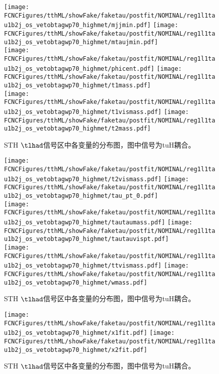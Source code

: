 \begin{figure}[H]
\centering
\texttt{[image: \\FCNCFigures/tthML/showFake/faketau/postfit/NOMINAL/reg1l1tau1b2j\_os\_vetobtagwp70\_highmet/mjjmin.pdf]}
\texttt{[image: \\FCNCFigures/tthML/showFake/faketau/postfit/NOMINAL/reg1l1tau1b2j\_os\_vetobtagwp70\_highmet/mtaujmin.pdf]}
\\
\texttt{[image: \\FCNCFigures/tthML/showFake/faketau/postfit/NOMINAL/reg1l1tau1b2j\_os\_vetobtagwp70\_highmet/phicent.pdf]}
\texttt{[image: \\FCNCFigures/tthML/showFake/faketau/postfit/NOMINAL/reg1l1tau1b2j\_os\_vetobtagwp70\_highmet/t1mass.pdf]}
\\
\texttt{[image: \\FCNCFigures/tthML/showFake/faketau/postfit/NOMINAL/reg1l1tau1b2j\_os\_vetobtagwp70\_highmet/t1vismass.pdf]}
\texttt{[image: \\FCNCFigures/tthML/showFake/faketau/postfit/NOMINAL/reg1l1tau1b2j\_os\_vetobtagwp70\_highmet/t2mass.pdf]}
\\
\caption{STH $\tlhad$信号区中各变量的分布图，图中信号为tuH耦合。}
\label{fig:var_reg1l1tau1b2j_os_vetobtagwp70_highmet_3}
\end{figure}
\begin{figure}[H]
\centering
\texttt{[image: \\FCNCFigures/tthML/showFake/faketau/postfit/NOMINAL/reg1l1tau1b2j\_os\_vetobtagwp70\_highmet/t2vismass.pdf]}
\texttt{[image: \\FCNCFigures/tthML/showFake/faketau/postfit/NOMINAL/reg1l1tau1b2j\_os\_vetobtagwp70\_highmet/tau\_pt\_0.pdf]}
\\
\texttt{[image: \\FCNCFigures/tthML/showFake/faketau/postfit/NOMINAL/reg1l1tau1b2j\_os\_vetobtagwp70\_highmet/tautaumass.pdf]}
\texttt{[image: \\FCNCFigures/tthML/showFake/faketau/postfit/NOMINAL/reg1l1tau1b2j\_os\_vetobtagwp70\_highmet/tautauvispt.pdf]}
\\
\texttt{[image: \\FCNCFigures/tthML/showFake/faketau/postfit/NOMINAL/reg1l1tau1b2j\_os\_vetobtagwp70\_highmet/ttvismass.pdf]}
\texttt{[image: \\FCNCFigures/tthML/showFake/faketau/postfit/NOMINAL/reg1l1tau1b2j\_os\_vetobtagwp70\_highmet/wmass.pdf]}
\\
\caption{STH $\tlhad$信号区中各变量的分布图，图中信号为tuH耦合。}
\label{fig:var_reg1l1tau1b2j_os_vetobtagwp70_highmet_4}
\end{figure}
\begin{figure}[H]
\centering
\texttt{[image: \\FCNCFigures/tthML/showFake/faketau/postfit/NOMINAL/reg1l1tau1b2j\_os\_vetobtagwp70\_highmet/x1fit.pdf]}
\texttt{[image: \\FCNCFigures/tthML/showFake/faketau/postfit/NOMINAL/reg1l1tau1b2j\_os\_vetobtagwp70\_highmet/x2fit.pdf]}
\\
\caption{STH $\tlhad$信号区中各变量的分布图，图中信号为tuH耦合。}
\label{fig:var_reg1l1tau1b2j_os_vetobtagwp70_highmet}
\end{figure}
